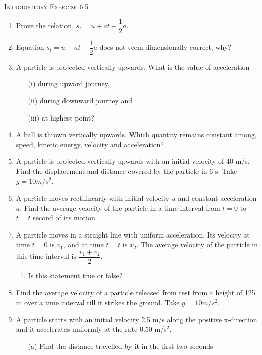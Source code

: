 \documentclass{article}
\renewcommand{\frac}[2]{\dfrac{#1}{#2}}
\begin{document}
\pagebreak
\begin{center}
    \textsc{Introductory Exercise 6.5}
\end{center}
\begin{enumerate}
    \item Prove the relation, \( s_t = u + at - \frac{1}{2} a \).
    \item Equation \( s_t = u + at - \frac{1}{2} a \) does not seem dimensionally correct, why?
    \item A particle is projected vertically upwards. What is the value of acceleration
    \begin{enumerate}
        \item[(i)] during upward journey,
        \item[(ii)] during downward journey and
        \item[(iii)] at highest point?
    \end{enumerate}
    \item A ball is thrown vertically upwards. Which quantity remains constant among, speed, kinetic energy, velocity and acceleration?
    \item A particle is projected vertically upwards with an initial velocity of 40 m/s. Find the displacement and distance covered by the particle in 6 s. Take \( g = 10 m/s^2 \).
    \item A particle moves rectilinearly with initial velocity \( u \) and constant acceleration \( a \). Find the average velocity of the particle in a time interval from \( t = 0 \) to \( t = t \) second of its motion.
    \item A particle moves in a straight line with uniform acceleration. Its velocity at time \( t = 0 \) is \( v_1 \), and at time \( t = t \) is \( v_2 \). The average velocity of the particle in this time interval is \( \frac{v_1 + v_2}{2} \).
    \begin{enumerate}
        \item Is this statement true or false?
    \end{enumerate}
    \item Find the average velocity of a particle released from rest from a height of 125 m over a time interval till it strikes the ground. Take \( g = 10 m/s^2 \).
    \item A particle starts with an initial velocity 2.5 m/s along the positive x-direction and it accelerates uniformly at the rate 0.50 m/s\(^2\).
    \begin{enumerate}
        \item[(a)] Find the distance travelled by it in the first two seconds

\end{enumerate}
\end{enumerate}
\end{document}

